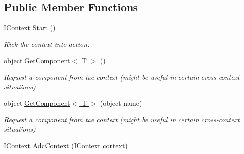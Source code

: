 \subsection*{Public Member Functions}
\begin{DoxyCompactItemize}
\item 
\hypertarget{interfacestrange_1_1extensions_1_1context_1_1api_1_1_i_context_ab29c9eb26414deed84d0e02ef1c12869}{\hyperlink{interfacestrange_1_1extensions_1_1context_1_1api_1_1_i_context}{I\-Context} \hyperlink{interfacestrange_1_1extensions_1_1context_1_1api_1_1_i_context_ab29c9eb26414deed84d0e02ef1c12869}{Start} ()}\label{interfacestrange_1_1extensions_1_1context_1_1api_1_1_i_context_ab29c9eb26414deed84d0e02ef1c12869}

\begin{DoxyCompactList}\small\item\em Kick the context into action. \end{DoxyCompactList}\item 
\hypertarget{interfacestrange_1_1extensions_1_1context_1_1api_1_1_i_context_a50599e2a7432aa68b579882a434ff0c2}{object \hyperlink{interfacestrange_1_1extensions_1_1context_1_1api_1_1_i_context_a50599e2a7432aa68b579882a434ff0c2}{Get\-Component$<$ T $>$} ()}\label{interfacestrange_1_1extensions_1_1context_1_1api_1_1_i_context_a50599e2a7432aa68b579882a434ff0c2}

\begin{DoxyCompactList}\small\item\em Request a component from the context (might be useful in certain cross-\/context situations) \end{DoxyCompactList}\item 
\hypertarget{interfacestrange_1_1extensions_1_1context_1_1api_1_1_i_context_a00ae657d3971417e6e13e125f769d94f}{object \hyperlink{interfacestrange_1_1extensions_1_1context_1_1api_1_1_i_context_a00ae657d3971417e6e13e125f769d94f}{Get\-Component$<$ T $>$} (object name)}\label{interfacestrange_1_1extensions_1_1context_1_1api_1_1_i_context_a00ae657d3971417e6e13e125f769d94f}

\begin{DoxyCompactList}\small\item\em Request a component from the context (might be useful in certain cross-\/context situations) \end{DoxyCompactList}\item 
\hypertarget{interfacestrange_1_1extensions_1_1context_1_1api_1_1_i_context_a7aef991d8881ce583bcde52fd0c29c4d}{\hyperlink{interfacestrange_1_1extensions_1_1context_1_1api_1_1_i_context}{I\-Context} \hyperlink{interfacestrange_1_1extensions_1_1context_1_1api_1_1_i_context_a7aef991d8881ce583bcde52fd0c29c4d}{Add\-Context} (\hyperlink{interfacestrange_1_1extensions_1_1context_1_1api_1_1_i_context}{I\-Context} context)}\label{interfacestrange_1_1extensions_1_1context_1_1api_1_1_i_context_a7aef991d8881ce583bcde52fd0c29c4d}


\end{DoxyCompactItemize}
